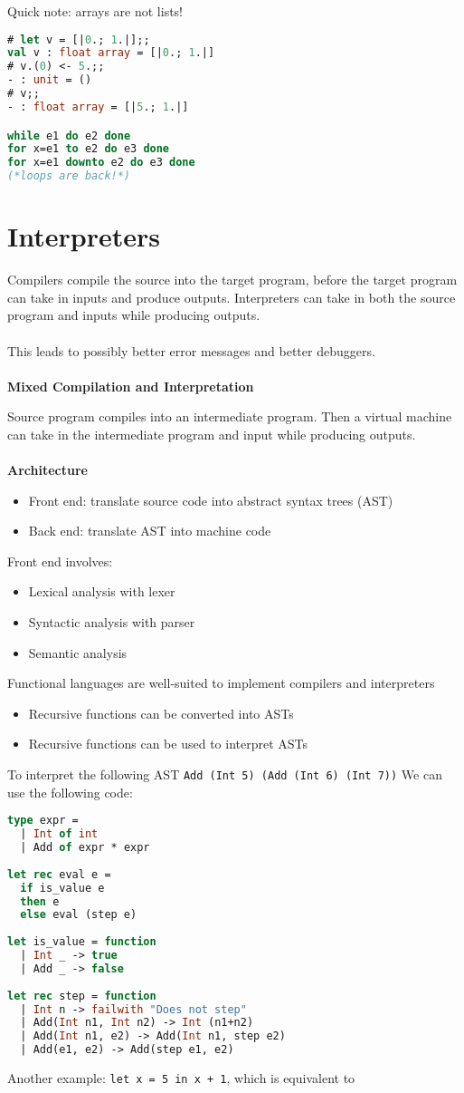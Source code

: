 \documentclass[12pt,a4paper]{article} %
\begin{document}
Quick note: arrays are not lists!
\begin{lstlisting}[language=Caml]
# let v = [|0.; 1.|];;
val v : float array = [|0.; 1.|]
# v.(0) <- 5.;;
- : unit = ()
# v;;
- : float array = [|5.; 1.|]

while e1 do e2 done
for x=e1 to e2 do e3 done
for x=e1 downto e2 do e3 done
(*loops are back!*)
\end{lstlisting}
\section{Interpreters}
Compilers compile the source into the target program, before the target program can take in inputs and produce outputs. Interpreters can take in both the source program and inputs while producing outputs.
\\\\
This leads to possibly better error messages and better debuggers.
\\\\
\textbf{Mixed Compilation and Interpretation}

Source program compiles into an intermediate program. Then a virtual machine can take in the intermediate program and input while producing outputs.
\\\\
\textbf{Architecture}
	\begin{itemize}
	\item Front end: translate source code into abstract syntax trees (AST)
	\item Back end: translate AST into machine code
	\end{itemize}
Front end involves:
	\begin{itemize}
	\item Lexical analysis with lexer
	\item Syntactic analysis with parser
	\item Semantic analysis
	\end{itemize}
Functional languages are well-suited to implement compilers and interpreters
	\begin{itemize}
	\item Recursive functions can be converted into ASTs
	\item Recursive functions can be used to interpret ASTs
	\end{itemize}
To interpret the following AST \verb|Add (Int 5) (Add (Int 6) (Int 7))| We can use the following code:
\begin{lstlisting}[language=Caml]
type expr =
  | Int of int
  | Add of expr * expr
           
let rec eval e =
  if is_value e
  then e
  else eval (step e)
      
let is_value = function
  | Int _ -> true
  | Add _ -> false
    
let rec step = function
  | Int n -> failwith "Does not step"
  | Add(Int n1, Int n2) -> Int (n1+n2)
  | Add(Int n1, e2) -> Add(Int n1, step e2)
  | Add(e1, e2) -> Add(step e1, e2)
\end{lstlisting}
Another example: \verb|let x = 5 in x + 1|, which is equivalent to 
\end{document}
